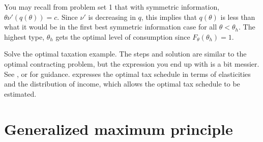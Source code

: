 You may recall from problem set 1 that with symmetric information,
$\theta \nu'(q(\theta)) = c$. Since $\nu'$ is decreasing in $q$, this
implies that $q(\theta)$ is less than what it would be in the first
best symmetric information case for all $\theta < \theta_h$. The
highest type, $\theta_h$ gets the optimal level of consumption since
$F_\theta(\theta_h) = 1$. 

\begin{exercise}[difficult]
  Solve the optimal taxation example. The steps and solution are
  similar to the optimal contracting problem, but the expression you
  end up with is a bit messier. See \cite{mirrlees1971}, or
  \cite{diamond1998} for guidance. \cite{saez2001} expresses the
  optimal tax schedule in terms of elasticities and the distribution
  of income, which allows the optimal tax schedule to be estimated. 
\end{exercise}

\appendix

\section{Generalized maximum principle}

